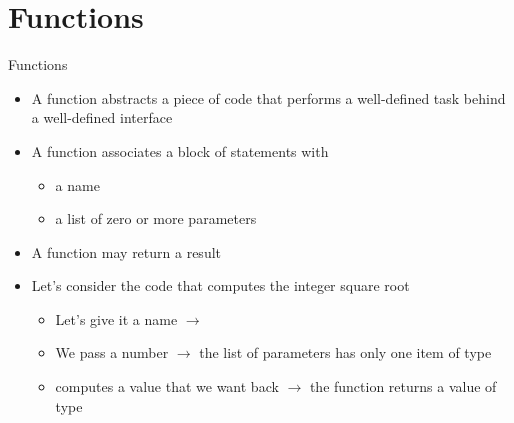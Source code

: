 

\section{Functions}

\begin{frame}{Functions}

  \begin{itemize}[<+->]
  \item A function abstracts a piece of code that performs a well-defined task
    behind a well-defined interface
  \item A function associates a block of statements with
    \begin{itemize}
    \item a name
    \item a list of zero or more parameters
    \end{itemize}
  \item A function may return a result
  \end{itemize}

  \begin{itemize}[<+->]
  \item Let's consider the code that computes the integer square root
    \begin{itemize}
    \item Let's give it a name $\rightarrow$ 
    \item We pass  a number $\rightarrow$ the list of parameters has
      only one item of type 
    \item {} computes a value that we want back $\rightarrow$ the
      function returns a value of type 
    \end{itemize}
  \end{itemize}

\end{frame}

